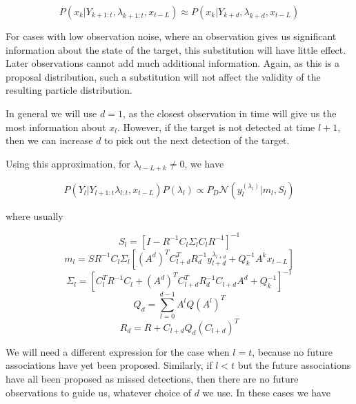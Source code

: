 \begin{equation}
P(x_k|Y_{k+1:t}, \lambda_{k+1:t}, x_{t-L}) \approx P(x_k|Y_{k+d}, \lambda_{k+d}, x_{t-L})
\end{equation}

For cases with low observation noise, where an observation gives us significant information about the state of the target, this substitution will have little effect. Later observations cannot add much additional information. Again, as this is a proposal distribution, such a substitution will not affect the validity of the resulting particle distribution.

In general we will use $d=1$, as the closest observation in time will give us the most information about $x_{l}$. However, if the target is not detected at time $l+1$, then we can increase $d$ to pick out the next detection of the target.

Using this approximation, for $\lambda_{t-L+k} \ne 0$, we have

\begin{equation}
P(Y_{l}|Y_{l+1:t} \lambda_{l:t}, x_{t-L}) P(\lambda_{l}) \propto P_D \mathcal{N}(y_{l}^{(\lambda_{l})}|m_{l}, S_{l})
\end{equation}

where usually

\begin{equation} S_{l} = [ I - R^{-1} C_{l} \Sigma_{l} C_{l} R^{-1} ]^{-1} \end{equation}
\begin{equation} m_{l} = S R^{-1} C_{l} \Sigma_{l} [ (A^d)^T C_{l+d}^T R_d^{-1} y_{l+d}^{\lambda_{l+d}} + Q_k^{-1} A^k x_{t-L} ] \end{equation}
\begin{equation} \Sigma_{l} = [ C_{l}^T R^{-1} C_{l} + (A^d)^T C_{l+d}^T R_d^{-1} C_{l+d} A^d + Q_k^{-1}]^{-1} \end{equation}
\begin{equation} Q_d = \sum_{l=0}^{d-1} {A^l Q (A^l)^T} \end{equation}
\begin{equation} R_d = R + C_{l+d} Q_d (C_{l+d})^T \end{equation}

We will need a different expression for the case when $l=t$, because no future associations have yet been proposed. Similarly, if $l<t$ but the future associations have all been proposed as missed detections, then there are no future observations to guide us, whatever choice of $d$ we use. In these cases we have

